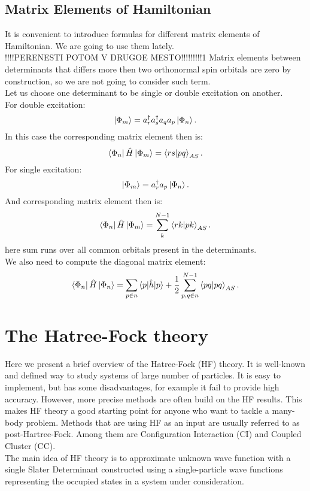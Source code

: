 \documentclass[twoside,english]{uiofysmaster}
\theoremstyle{definition}
\begin{document}
\section{Matrix Elements of Hamiltonian}
It is convenient to introduce formulas for different matrix elements of Hamiltonian. We are going to use them lately. \\
!!!!PERENESTI POTOM V DRUGOE MESTO!!!!!!!!!1
Matrix elements between determinants that differs more then two orthonormal spin orbitals are zero by construction, so we are not going to consider such term.\\
Let us choose one determinant to be single or double excitation on another. \\
For double excitation:
\begin{equation}
\ket{\Phi_{m}}=a^\dagger_r a^\dagger_s a_q a_p \ket{\Phi_n}.
\end{equation}
In this case the corresponding matrix element then is:
\begin{equation}
\bra{\Phi_n} \hat{H}\ket{\Phi_{m}}=\braket{rs|pq}_{AS}.
\end{equation}
For single excitation:
\begin{equation}
\ket{\Phi_{m}}=a^\dagger_r  a_p \ket{\Phi_n}.
\end{equation}
And corresponding matrix element then is:
\begin{equation}
\bra{\Phi_n} \hat{H}\ket{\Phi_{m}}=\sum_{k}^{N-1}\braket{rk|pk}_{AS}.
\end{equation}
here sum runs over all common orbitals present in the determinants.\\
We also need to compute the diagonal matrix element:
\begin{equation}
\bra{\Phi_n} \hat{H}\ket{\Phi_{n}}=\sum_{p\in n} \braket{p|\hat{h}|p} + \frac{1}{2} \sum_{p,q \in n}^{N-1}\braket{pq|pq}_{AS}.
\end{equation}

\chapter{The Hatree-Fock theory}\label{ch:HF}
Here we present a brief overview of the Hatree-Fock (HF) theory. It is  well-known and defined way to study systems of large number of particles. It is  easy to implement, but has some disadvantages, for example it fail to provide high accuracy. However, more precise methods are often build on the HF results. This makes HF theory a good starting point for anyone who want to tackle a many-body problem. Methods that are using HF as an input are usually referred to as post-Hartree-Fock. Among them are Configuration Interaction (CI) and Coupled Cluster (CC). \\
The main idea of HF theory is to approximate unknown wave function with a single Slater Determinant constructed using a single-particle wave functions representing the occupied states in a system under consideration. 
\end{document}
